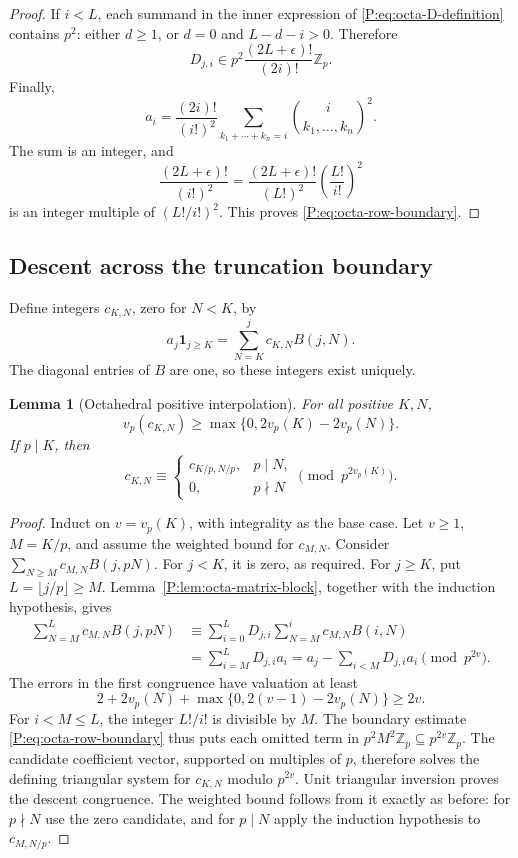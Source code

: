\documentclass[11pt,a4paper]{article}
\newtheorem{lemma}[theorem]{Lemma}
\theoremstyle{definition}\newtheorem{definition}[theorem]{Definition}
\theoremstyle{remark}\newtheorem{remark}[theorem]{Remark}
\numberwithin{equation}{section}
\begin{document}
\begin{proof}
If \(i<L\), each summand in the inner expression of
\eqref{P:eq:octa-D-definition} contains \(p^2\): either
\(d\geq1\), or \(d=0\) and \(L-d-i>0\).
Therefore
\[
 D_{j,i}\in p^2\frac{(2L+\epsilon)!}{(2i)!}\mathbb Z_p.
\]
Finally,
\[
 a_i=\frac{(2i)!}{(i!)^2}
       \sum_{k_1+\cdots+k_n=i}
       \binom{i}{k_1,\ldots,k_n}^{\!2}.
\]
The sum is an integer, and
\[
 \frac{(2L+\epsilon)!}{(i!)^2}
 =\frac{(2L+\epsilon)!}{(L!)^2}
       \left(\frac{L!}{i!}\right)^2
\]
is an integer multiple of \((L!/i!)^2\).
This proves \eqref{P:eq:octa-row-boundary}.
\end{proof}

\subsection{Descent across the truncation boundary}

Define integers \(c_{K,N}\), zero for \(N<K\), by
\[
 a_j\mathbf1_{j\geq K}
    =\sum_{N=K}^j c_{K,N}B(j,N).
\]
The diagonal entries of \(B\) are one, so these integers
exist uniquely.

\begin{lemma}[Octahedral positive interpolation]
\label{P:lem:octa-positive-descent}
For all positive \(K,N\),
\[
 v_p(c_{K,N})\geq\max\{0,2v_p(K)-2v_p(N)\}.
\]
If \(p\mid K\), then
\[
 c_{K,N}\equiv
 \begin{cases}
 c_{K/p,N/p},&p\mid N,\\
 0,&p\nmid N
 \end{cases}
 \pmod{p^{2v_p(K)}}.
\]
\end{lemma}

\begin{proof}
Induct on \(v=v_p(K)\), with integrality as the base case.
Let \(v\geq1\), \(M=K/p\), and assume the weighted bound
for \(c_{M,N}\).  Consider
\(\sum_{N\geq M}c_{M,N}B(j,pN)\).
For \(j<K\), it is zero, as required.
For \(j\geq K\), put \(L=\lfloor j/p\rfloor\geq M\).
Lemma~\ref{P:lem:octa-matrix-block}, together with the induction
hypothesis, gives
\begin{align*}
 \sum_{N=M}^{L}c_{M,N}B(j,pN)
 &\equiv\sum_{i=0}^{L}D_{j,i}
                \sum_{N=M}^{i}c_{M,N}B(i,N)\\
 &=\sum_{i=M}^{L}D_{j,i}a_i
 =a_j-\sum_{i<M}D_{j,i}a_i
 \pmod{p^{2v}}.
\end{align*}
The errors in the first congruence have valuation at least
\[
 2+2v_p(N)+\max\{0,2(v-1)-2v_p(N)\}\geq2v.
\]
For \(i<M\leq L\), the integer \(L!/i!\) is divisible by
\(M\).  The boundary estimate
\eqref{P:eq:octa-row-boundary} thus puts each omitted term in
\(p^2M^2\mathbb Z_p\subseteq p^{2v}\mathbb Z_p\).
The candidate coefficient vector, supported on multiples of
\(p\), therefore solves the defining triangular system for
\(c_{K,N}\) modulo \(p^{2v}\).
Unit triangular inversion proves the descent congruence.
The weighted bound follows from it exactly as before: for
\(p\nmid N\) use the zero candidate, and for \(p\mid N\)
apply the induction hypothesis to \(c_{M,N/p}\).
\end{proof}
\end{document}
